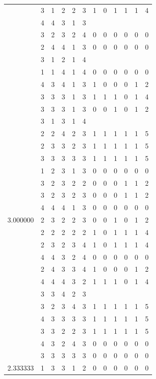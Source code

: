 \documentclass[]{book}
\theoremstyle{definition}
\theoremstyle{definition}
\theoremstyle{definition}
\theoremstyle{remark}
\begin{document}
\begin{table}
{\begin{tabular}[t]{rrrrrrrrrrrr}
 & 3 & 1 & 2 & 2 & 3 & 1 & 0 & 1 & 1 & 1 & 4\\
 & 4 & 4 & 3 & 1 & 3 &  &  &  &  &  & \\
 & 3 & 2 & 3 & 2 & 4 & 0 & 0 & 0 & 0 & 0 & 0\\
 & 2 & 4 & 4 & 1 & 3 & 0 & 0 & 0 & 0 & 0 & 0\\
 & 3 & 1 & 2 & 1 & 4 &  &  &  &  &  & \\
 & 1 & 1 & 4 & 1 & 4 & 0 & 0 & 0 & 0 & 0 & 0\\
 & 4 & 3 & 4 & 1 & 3 & 1 & 0 & 0 & 0 & 1 & 2\\
 & 3 & 3 & 3 & 1 & 3 & 1 & 1 & 1 & 0 & 1 & 4\\
 & 3 & 3 & 3 & 1 & 3 & 0 & 0 & 1 & 0 & 1 & 2\\
 & 3 & 1 & 3 & 1 & 4 &  &  &  &  &  & \\
 & 2 & 2 & 4 & 2 & 3 & 1 & 1 & 1 & 1 & 1 & 5\\
 & 2 & 3 & 3 & 2 & 3 & 1 & 1 & 1 & 1 & 1 & 5\\
 & 3 & 3 & 3 & 3 & 3 & 1 & 1 & 1 & 1 & 1 & 5\\
 & 1 & 2 & 3 & 1 & 3 & 0 & 0 & 0 & 0 & 0 & 0\\
 & 3 & 2 & 3 & 2 & 2 & 0 & 0 & 0 & 1 & 1 & 2\\
 & 3 & 2 & 3 & 2 & 3 & 0 & 0 & 0 & 1 & 1 & 2\\
 & 4 & 4 & 4 & 1 & 3 & 0 & 0 & 0 & 0 & 0 & 0\\
3.000000 & 2 & 3 & 2 & 2 & 3 & 0 & 0 & 1 & 0 & 1 & 2\\
 & 2 & 2 & 2 & 2 & 2 & 1 & 0 & 1 & 1 & 1 & 4\\
 & 2 & 3 & 2 & 3 & 4 & 1 & 0 & 1 & 1 & 1 & 4\\
 & 4 & 4 & 3 & 2 & 4 & 0 & 0 & 0 & 0 & 0 & 0\\
 & 2 & 4 & 3 & 3 & 4 & 1 & 0 & 0 & 0 & 1 & 2\\
 & 4 & 4 & 4 & 3 & 2 & 1 & 1 & 1 & 0 & 1 & 4\\
 & 3 & 3 & 4 & 2 & 3 &  &  &  &  &  & \\
 & 3 & 2 & 3 & 4 & 3 & 1 & 1 & 1 & 1 & 1 & 5\\
 & 4 & 3 & 3 & 3 & 3 & 1 & 1 & 1 & 1 & 1 & 5\\
 & 3 & 3 & 2 & 2 & 3 & 1 & 1 & 1 & 1 & 1 & 5\\
 & 4 & 3 & 2 & 4 & 3 & 0 & 0 & 0 & 0 & 0 & 0\\
 & 3 & 3 & 3 & 3 & 3 & 0 & 0 & 0 & 0 & 0 & 0\\
2.333333 & 1 & 3 & 3 & 1 & 2 & 0 & 0 & 0 & 0 & 0 & 0\\

\end{tabular}}
\end{table}
\end{document}
